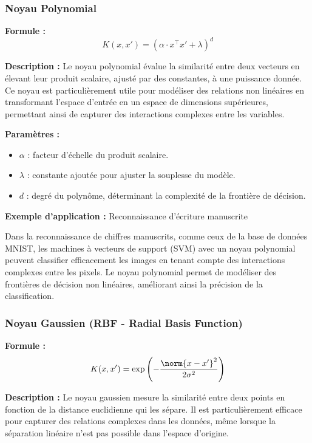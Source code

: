 \subsubsection{Noyau Polynomial}

\textbf{Formule :}
\begin{equation}
K(x, x') = (\alpha \cdot x^\top x' + \lambda)^d
\label{eq:noyau_polynomial}
\end{equation}

\textbf{Description :} Le noyau polynomial évalue la similarité entre deux vecteurs en élevant leur produit scalaire, ajusté par des constantes, à une puissance donnée. Ce noyau est particulièrement utile pour modéliser des relations non linéaires en transformant l'espace d'entrée en un espace de dimensions supérieures, permettant ainsi de capturer des interactions complexes entre les variables.

\textbf{Paramètres :}
\begin{itemize}
\item $\alpha$ : facteur d'échelle du produit scalaire.
\item $\lambda$ : constante ajoutée pour ajuster la souplesse du modèle.
\item $d$ : degré du polynôme, déterminant la complexité de la frontière de décision.
\end{itemize}

\textbf{Exemple d'application :} Reconnaissance d'écriture manuscrite

Dans la reconnaissance de chiffres manuscrits, comme ceux de la base de données MNIST, les machines à vecteurs de support (SVM) avec un noyau polynomial peuvent classifier efficacement les images en tenant compte des interactions complexes entre les pixels. Le noyau polynomial permet de modéliser des frontières de décision non linéaires, améliorant ainsi la précision de la classification.

\subsubsection{Noyau Gaussien (RBF - Radial Basis Function)}

\textbf{Formule :}
\begin{equation}
K(x, x') = \exp\left(-\frac{\norm{x - x'}^2}{2\sigma^2}\right)
\label{eq:noyau_gaussien}
\end{equation}

\textbf{Description :} Le noyau gaussien mesure la similarité entre deux points en fonction de la distance euclidienne qui les sépare. Il est particulièrement efficace pour capturer des relations complexes dans les données, même lorsque la séparation linéaire n'est pas possible dans l'espace d'origine.

